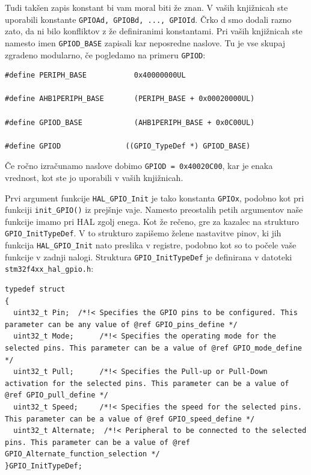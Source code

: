 \documentclass[12pt,letterpaper]{article}
\begin{document}
Tudi takšen zapis konstant bi vam moral biti že znan. V vaših knjižnicah ste uporabili konstante \texttt{GPIOAd, GPIOBd, ..., GPIOId}. Črko d smo dodali razno zato, da ni bilo konfliktov z že definiranimi konstantami. Pri vaših knjižnicah ste namesto imen \texttt{GPIOD\_BASE} zapisali kar neposredne naslove. Tu je vse skupaj zgradeno modularno, če pogledamo na primeru \texttt{GPIOD}:

\begin{center}
\begin{lstlisting}[style=CStyle]
#define PERIPH_BASE           0x40000000UL

#define AHB1PERIPH_BASE       (PERIPH_BASE + 0x00020000UL)

#define GPIOD_BASE            (AHB1PERIPH_BASE + 0x0C00UL)

#define GPIOD               ((GPIO_TypeDef *) GPIOD_BASE)
\end{lstlisting}
\end{center}

Če ročno izračunamo naslove dobimo \texttt{GPIOD = 0x40020C00}, kar je enaka vrednost, kot ste jo uporabili v vaših knjižnicah. 

Prvi argument funkcije \texttt{HAL\_GPIO\_Init} je tako konstanta \texttt{GPIOx}, podobno kot pri funkciji \texttt{init\_GPIO()} iz prejšnje vaje. Namesto preostalih petih argumentov naše funkcije imamo pri HAL zgolj enega. Kot že rečeno, gre za kazalec na strukturo \texttt{GPIO\_InitTypeDef}. V to strukturo zapišemo želene nastavitve pinov, ki jih funkcija \texttt{HAL\_GPIO\_Init} nato preslika v registre, podobno kot so to počele vaše funkcije v zadnji nalogi. Struktura \texttt{GPIO\_InitTypeDef} je definirana v datoteki \texttt{stm32f4xx\_hal\_gpio.h}:

\begin{center}
\begin{lstlisting}[style=CStyle]
typedef struct
{
  uint32_t Pin;  /*!< Specifies the GPIO pins to be configured. This parameter can be any value of @ref GPIO_pins_define */
  uint32_t Mode;      /*!< Specifies the operating mode for the selected pins. This parameter can be a value of @ref GPIO_mode_define */
  uint32_t Pull;      /*!< Specifies the Pull-up or Pull-Down activation for the selected pins. This parameter can be a value of @ref GPIO_pull_define */
  uint32_t Speed;     /*!< Specifies the speed for the selected pins. This parameter can be a value of @ref GPIO_speed_define */
  uint32_t Alternate;  /*!< Peripheral to be connected to the selected pins. This parameter can be a value of @ref GPIO_Alternate_function_selection */
}GPIO_InitTypeDef;
\end{lstlisting}
\end{center}
\end{document}
